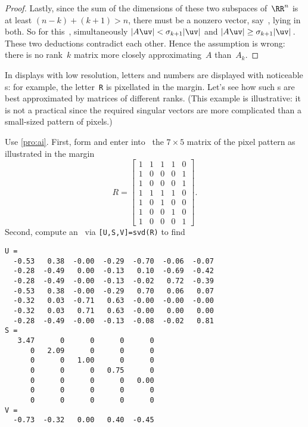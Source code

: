 \begin{proof}
Lastly, since the sum of the dimensions of these two subspaces of~\(\RR^n\) is at least \((n-k)+(k+1)>n\), there must be a nonzero vector, say~\uv, lying in both.
So for this~\uv, simultaneously \(|A\uv|<\sigma_{k+1}|\uv|\) and \(|A\uv|\geq\sigma_{k+1}|\uv|\)\,.
These two deductions contradict each other.
Hence the assumption is wrong: there is no rank~\(k\) matrix more closely approximating~\(A\) than~\(A_k\).
\end{proof}



\begin{example} \label{eg:}
In displays with low resolution, letters and numbers are displayed with noticeable s: for example, the letter~\verb|R| is pixellated in the margin.
\marginpar{}%
Let's see how such s are best approximated by matrices of different ranks.
(This example is illustrative: it is not a practical  since the required singular vectors are more complicated than a small-sized pattern of pixels.)
\begin{solution} 
Use \autoref{pro:ai}.
First, form and enter into \script\ the \(7\times5\) matrix of the pixel pattern as illustrated in the margin
\begin{equation*}
R=\begin{bmatrix} 1&1&1&1&0
\\1&0&0&0&1
\\1&0&0&0&1
\\1&1&1&1&0
\\1&0&1&0&0
\\1&0&0&1&0
\\1&0&0&0&1 \end{bmatrix}.
\end{equation*}
Second, compute an \svd\ via \verb|[U,S,V]=svd(R)| to find \twodp
\begin{verbatim}
U =
  -0.53   0.38  -0.00  -0.29  -0.70  -0.06  -0.07
  -0.28  -0.49   0.00  -0.13   0.10  -0.69  -0.42
  -0.28  -0.49  -0.00  -0.13  -0.02   0.72  -0.39
  -0.53   0.38  -0.00  -0.29   0.70   0.06   0.07
  -0.32   0.03  -0.71   0.63  -0.00  -0.00  -0.00
  -0.32   0.03   0.71   0.63  -0.00   0.00   0.00
  -0.28  -0.49  -0.00  -0.13  -0.08  -0.02   0.81
S =
   3.47      0      0      0      0
      0   2.09      0      0      0
      0      0   1.00      0      0
      0      0      0   0.75      0
      0      0      0      0   0.00
      0      0      0      0      0
      0      0      0      0      0
V =
  -0.73  -0.32   0.00   0.40  -0.45

\end{verbatim}
\end{solution}
\end{example}
